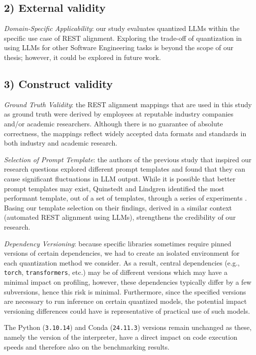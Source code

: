 \documentclass[conference]{IEEEtran}
\begin{document}
\subsection*{\textbf{2) External validity}}
    
\textit{Domain-Specific Applicability}: our study evaluates quantized LLMs within the specific use case of REST alignment. Exploring the trade-off of quantization in using LLMs for other Software Engineering tasks is beyond the scope of our thesis; however, it could be explored in future work.

\subsection*{\textbf{3) Construct validity}}

\textit{Ground Truth Validity}: the REST alignment mappings that are used in this study as ground truth were derived by employees at reputable industry companies and/or academic researchers. Although there is no guarantee of absolute correctness, the mappings reflect widely accepted data formats and standards in both industry and academic research.

\textit{Selection of Prompt Template}: the authors of the previous study that inspired our research questions explored different prompt templates and found that they can cause significant fluctuations in LLM output\cite{quinstedt2024Optimizing}. While it is possible that better prompt templates may exist, Quinstedt and Lindgren identified the most performant template, out of a set of templates, through a series of experiments \cite{quinstedt2024Optimizing}. Basing our template selection on their findings, derived in a similar context (automated REST alignment using LLMs), strengthens the credibility of our research.


\textit{Dependency Versioning}: because specific libraries sometimes require pinned versions of certain dependencies, we had to create an isolated environment for each quantization method we consider. As a result, central dependencies (e.g., \verb|torch|, \verb|transformers|, etc.) may be of different versions which may have a minimal impact on profiling, however, these dependencies typically differ by a few subversions, hence this risk is minimal. Furthermore, since the specified versions are necessary to run inference on certain quantized models, the potential impact versioning differences could have is representative of practical use of such models.

The Python (\verb|3.10.14|) and Conda (\verb|24.11.3|) versions remain unchanged as these, namely the version of the interpreter, have a direct impact on code execution speeds and therefore also on the benchmarking results.
\end{document}
